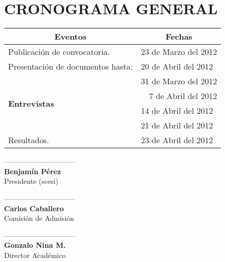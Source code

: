 \documentclass[11pt,letterpaper]{report}
\begin{document}
\section*{\bf \normalsize CRONOGRAMA GENERAL}
\begin{center}
\begin{tabular}{|l|l|}
\hline
\multicolumn{1}{|c|}{\bf  Eventos} & \multicolumn{1}{c|}{\bf Fechas}\\
\hline
Publicación de convocatoria. & 23 de Marzo del 2012\\
\hline
Presentación de documentos hasta: & 20 de Abril del 2012\\
\hline
\multirow{4}{*}{\bf Entrevistas} & 31 de Marzo del 2012 \\
\cline{2-2}
& ~~7 de Abril del 2012\\
\cline{2-2}
& 14 de Abril del 2012\\
\cline{2-2}
& 21 de Abril del 2012\\
\hline
Resultados. & 23 de Abril del 2012\\
\hline
\end{tabular}
\end{center}
 \vspace{2.3cm}
\begin{minipage}{0.25\textwidth}
\begin{center}
------------------------------\\
{\bf Benjamín Pérez}\\
Presidente (scesi)\\
\end{center}
\end{minipage}
\begin{minipage}{0.47\textwidth}
\begin{center}
------------------------------\\
{\bf Carlos Caballero}\\
Comisión de Admisión
\end{center}
\end{minipage}
\begin{minipage}{0.28\textwidth}

\begin{center}
------------------------------\\
{\bf Gonzalo Nina M.}\\
Director Académico\\
\end{center}
\end{minipage}
\end{document}
